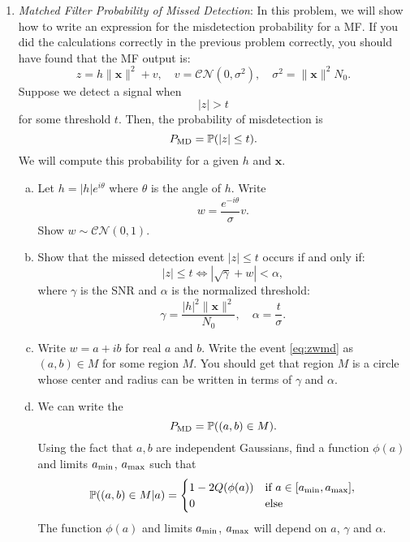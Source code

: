 \documentclass[11pt]{article}
\def\CNorm{{\mathcal{CN}}}
\def\Prob{{\mathbb{P}}}
\newcommand{\xbf}{\boldsymbol{x}}
\begin{document}
\begin{enumerate}
\item \label{prob:pmd} \emph{Matched Filter Probability of Missed Detection}:
In this problem, we will show how to write an expression for
the misdetection probability for a MF.
If you did the calculations correctly in the previous problem correctly, you should
have found that the MF output is:
\begin{equation} \label{eq:zmf}
    z = h\|\xbf\|^2 + v, \quad v = \CNorm(0, \sigma^2), \quad \sigma^2 = \|\xbf\|^2N_0.
\end{equation}
Suppose we detect a signal when
\[
    |z| > t
\]
for some threshold $t$.  Then, the probability of misdetection is
\[
    P_{\rm MD} = \Prob(|z| \leq t).
\]
We will compute this probability for a given $h$ and $\xbf$.
\begin{enumerate}[(a)]
\item Let $h = |h|e^{i\theta}$ where $\theta$ is the angle of $h$.  Write
\begin{equation} \label{eq:wdefdist}
    w = \frac{e^{-i\theta}}{\sigma} v.
\end{equation}
Show $w \sim \CNorm(0,1)$.

\item Show that the missed detection event $|z| \leq t$ occurs if and only if:
\begin{equation} \label{eq:zwmd}
    |z|\leq t \Longleftrightarrow  \left| \sqrt{\gamma} + w \right| < \alpha,
\end{equation}
where $\gamma$ is the SNR and $\alpha$ is the normalized threshold:
\begin{equation} \label{eq:gamalpha}
    \gamma = \frac{ |h|^2 \|\xbf\|^2}{N_0}, \quad
    \alpha = \frac{t}{\sigma}.
\end{equation}

\item Write $w = a+ib$ for real $a$ and $b$.  Write the event \eqref{eq:zwmd}
as $(a,b) \in M$ for some region $M$.
You should get that  region $M$ is a circle whose center and radius can be written
in terms of $\gamma$ and $\alpha$.


\item We can write the
\[
    P_{\rm MD} = \Prob((a,b) \in M).
\]
Using the fact that $a,b$ are independent Gaussians, find a function $\phi(a)$
and limits $a_{\rm min}$, $a_{\rm max}$ such that
\begin{equation} \label{eq:pmd_cond_cases}
    \Prob( (a,b) \in M | a) = \begin{cases}
        1-2Q(\phi(a)) & \mbox{if } a \in [a_{\rm min}, a_{\rm max}], \\
        0 & \mbox{else}
        \end{cases}
\end{equation}
The function $\phi(a)$ and limits $a_{\rm min}$, $a_{\rm max}$
will depend on $a$, $\gamma$ and $\alpha$.


\end{enumerate}
\end{enumerate}
\end{document}
